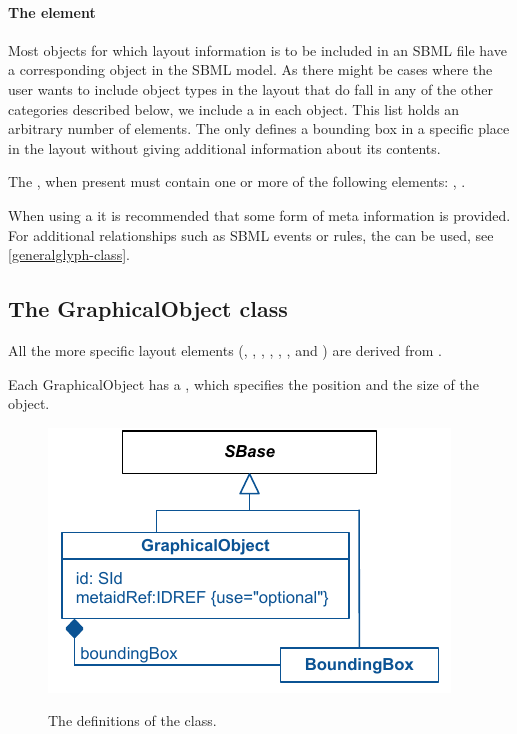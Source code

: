 \paragraph{The  element}
\label{listofadditionalgraphicalobjects-class}
Most objects for which layout information is to be included in an SBML 
file have a corresponding object in the SBML model. As there might be 
cases where the user wants to include object types in the layout that do 
fall in any of the other categories described below, we include a 
 in each \Layout object. This 
list holds an arbitrary number of  elements. The 
 only defines a bounding box in a specific place 
in the layout without giving additional information about its contents. 

The , when present must contain 
one or more of the following elements: \GraphicalObject, \GeneralGlyph. 

When using a \GraphicalObject it is recommended that some form of meta 
information is provided. For additional relationships such as SBML events 
or rules, the \GeneralGlyph can be used, see \ref{generalglyph-class}. 


\subsection{The GraphicalObject class} 
\label{graphicalobject-class}
All the more specific layout elements (\CompartmentGlyph, \GeneralGlyph, 
\SpeciesGlyph, \ReactionGlyph, \ReferenceGlyph, \TextGlyph, and 
\SpeciesReferenceGlyph) are derived from \GraphicalObject. 

Each GraphicalObject has a \BoundingBox, which specifies the position 
and the size of the object. 


\begin{figure}[!h]
\includegraphics{uml/layout-graphicalobject-uml}\\
\label{uml:graphicalobject}
\caption{The definitions of the \GraphicalObject class.}
\end{figure}

